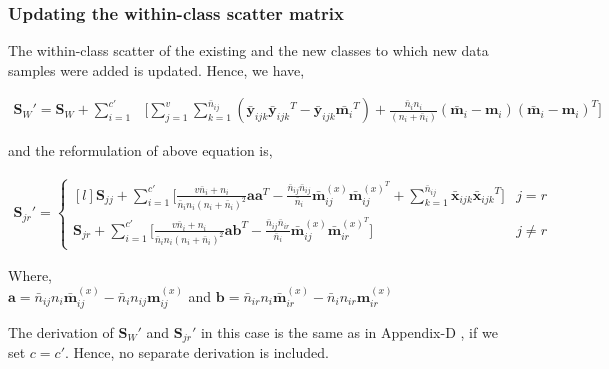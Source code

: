 \subsubsection{Updating the within-class scatter matrix}
\label{ssubs:MvIDA_ChkNC_Sw}
The within-class scatter of the existing and the new classes to which new data samples were added is updated. Hence, we have,

\begin{equation}
\label{eqn:4Sw}
\begin{split}
\textbf{S}_W' = \textbf{S}_W + \sum_{i=1}^{c'} & \Bigg[ \sum_{j=1}^{v} \sum_{k=1}^{\bar{n}_{ij}} \left ( \bar{\textbf{y}}_{ijk} {\bar{\textbf{y}}_{ijk}}^T - \bar{\textbf{y}}_{ijk} \bar{\textbf{m}_i}^T \right ) + \frac{\bar{n}_{i} n_{i}}{(n_{i}+\bar{n}_{i})} \left ( \bar{\textbf{m}}_i - \textbf{m}_{i} \right ) \left ( \bar{\textbf{m}}_i - \textbf{m}_{i} \right )^T  \Bigg]
\end{split}
\end{equation}

\noindent
and the reformulation of above equation is,

\begin{equation}
\label{eqn:4Sjr}
\begin{split}
\textbf{S}_{jr}' = \left\{\begin{matrix*}[l]
\textbf{S}_{jj} + \sum\limits_{i=1}^{c'} \bigg[ \frac{v \bar{n}_i + n_i}{\bar{n}_i n_i (n_i + \bar{n}_i)^2} \textbf{a} \textbf{a}^T - \frac{\bar{n}_{ij} \bar{n}_{ij}}{\bar{n}_i} \bar{\textbf{m}}_{ij}^{(x)} \bar{\textbf{m}}_{ij}^{(x)^T} + \sum\limits_{k=1}^{\bar{n}_{ij}} \bar{\textbf{x}}_{ijk} {\bar{\textbf{x}}_{ijk}}^T \bigg] & j=r \\[0.3cm]
\textbf{S}_{jr} + \sum\limits_{i=1}^{c'} \bigg[ \frac{v \bar{n}_i + n_i}{\bar{n}_i n_i (n_i + \bar{n}_i)^2} \textbf{a} \textbf{b}^T - \frac{\bar{n}_{ij} \bar{n}_{ir}}{\bar{n}_i} \bar{\textbf{m}}_{ij}^{(x)} \bar{\textbf{m}}_{ir}^{(x)^T} \bigg] & j \neq r
\end{matrix*}\right.
\end{split}
\end{equation}

\noindent
Where,\\
$\textbf{a} = \bar{n}_{ij} n_i \bar{\textbf{m}}_{ij}^{(x)} - \bar{n}_i n_{ij} \textbf{m}_{ij}^{(x)}$ and $\textbf{b} = \bar{n}_{ir} n_i \bar{\textbf{m}}_{ir}^{(x)} - \bar{n}_i n_{ir} \textbf{m}_{ir}^{(x)}$

\noindent
The derivation of $\textbf{S}_{W}'$ and $\textbf{S}_{jr}'$ in this case is the same as in Appendix-D%
, if we set $c=c'$. Hence, no separate derivation is included.



